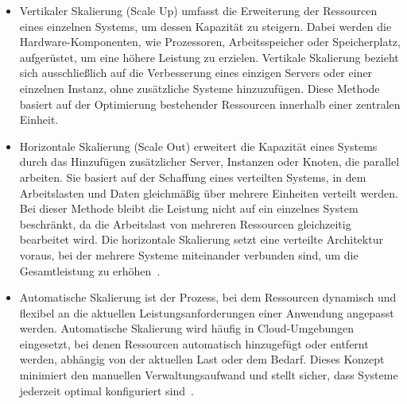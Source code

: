 \begin{itemize}
    \item Vertikaler Skalierung (Scale Up) umfasst die Erweiterung der Ressourcen eines einzelnen Systems,
um dessen Kapazität zu steigern.
Dabei werden die Hardware-Komponenten, wie Prozessoren, Arbeitsspeicher oder Speicherplatz, aufgerüstet,
um eine höhere Leistung zu erzielen.
Vertikale Skalierung bezieht sich ausschließlich auf die Verbesserung eines einzigen Servers oder einer
einzelnen Instanz, ohne zusätzliche Systeme hinzuzufügen.
Diese Methode basiert auf der Optimierung bestehender Ressourcen innerhalb einer zentralen Einheit.
    \item Horizontale Skalierung (Scale Out) erweitert die Kapazität eines Systems durch das Hinzufügen
zusätzlicher Server, Instanzen oder Knoten, die parallel arbeiten.
Sie basiert auf der Schaffung eines verteilten Systems, in dem Arbeitslasten und Daten gleichmäßig über mehrere
Einheiten verteilt werden.
Bei dieser Methode bleibt die Leistung nicht auf ein einzelnes System beschränkt, da die Arbeitslast von
mehreren Ressourcen gleichzeitig bearbeitet wird.
Die horizontale Skalierung setzt eine verteilte Architektur voraus, bei der mehrere Systeme miteinander verbunden sind,
um die Gesamtleistung zu erhöhen~\cite{ibm-scaling}.
    \item Automatische Skalierung ist der Prozess, bei dem Ressourcen dynamisch und flexibel an die aktuellen
Leistungsanforderungen einer Anwendung angepasst werden.
Automatische Skalierung wird häufig in Cloud-Umgebungen eingesetzt, bei denen Ressourcen automatisch hinzugefügt
oder entfernt werden, abhängig von der aktuellen Last oder dem Bedarf.
Dieses Konzept minimiert den manuellen Verwaltungsaufwand und stellt sicher, dass Systeme
jederzeit optimal konfiguriert sind~\cite{mic-autoscaling}.
\end{itemize}


